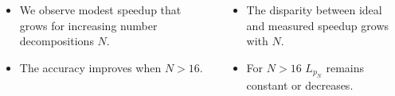 \documentclass[9pt]{beamer}
\begin{document}
\begin{frame}
\begin{columns}
{\begin{figure}
\end{figure}}
\end{columns}
\begin{columns}
\begin{itemize}
\item{We observe modest speedup that grows for increasing number decompositions $N$.}
\item{The accuracy improves when $N>16$.}
\end{itemize}
\begin{itemize}
\item<2->{The disparity between ideal and measured speedup grows with $N$.}
\item<2->{For $N>16$ $L_{p_N}$ remains constant or decreases.}
\end{itemize}
\end{columns}
\end{frame}
\end{document}
